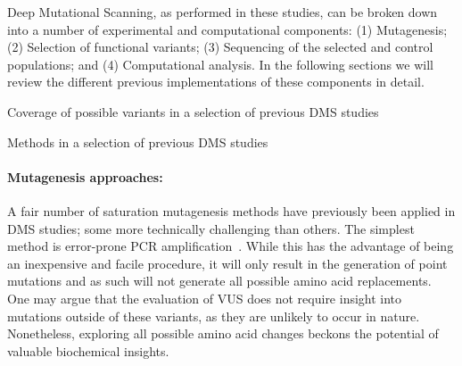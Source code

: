 Deep Mutational Scanning, as performed in these studies, can be broken down into a number of experimental and computational components: (1) Mutagenesis; (2) Selection of functional variants; (3) Sequencing of the selected and control populations; and (4) Computational analysis. In the following sections we will review the different previous implementations of these components in detail.


\begin{landscape}
\begin{table}
	\centering
	\caption{Coverage of possible variants in a selection of previous DMS studies}
	\label{table:DMSstudiesTP}
	
\end{table}

\begin{table}
	\centering
	\caption{Methods in a selection of previous DMS studies}
	\label{table:DMSstudiesMethods}
	
\end{table}
\end{landscape}






\paragraph{Mutagenesis approaches:} A fair number of saturation mutagenesis methods have previously been applied in DMS studies; some more technically challenging than others. The simplest method is error-prone PCR amplification~\cite{cadwell_mutagenic_1994,mohan_pcr_2011}. While this has the advantage of being an inexpensive and facile procedure, it will only result in the generation of point mutations and as such will not generate all possible amino acid replacements. One may argue that the evaluation of VUS does not require insight into mutations outside of these variants, as they are unlikely to occur in nature. Nonetheless, exploring all possible amino acid changes beckons the potential of valuable biochemical insights. 

